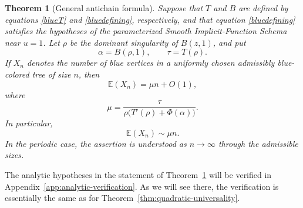 \documentclass[10pt,a4paper]{amsart}
\newtheorem{theorem}{Theorem}[section]
\theoremstyle{remark}
\begin{document}
\begin{theorem}[General antichain formula]\label{thm:bluegeneral}
Suppose that $T$ and $B$ are defined by equations \eqref{blueT} and
\eqref{bluedefining}, respectively, and that equation \eqref{bluedefining} satisfies the hypotheses
of the parameterized Smooth Implicit-Function Schema near $u=1$.  Let $\rho$
be the dominant singularity of $B(z,1)$, and put
\[
\alpha=B(\rho,1),\qquad \tau=T(\rho).
\]
If $X_n$ denotes the number of blue vertices in a uniformly chosen
admissibly blue-colored tree of size $n$, then
\[
\mathbb E(X_n)=\mu n+O(1),
\]
where
\begin{equation}\label{blueconstant}
{
\mu=
\frac{\tau}
{\rho\bigl(T'(\rho)+\Phi(\alpha)\bigr)}.
}
\end{equation}
In particular,
\[
\mathbb E(X_n)\sim \mu n.
\]
In the periodic case, the assertion is understood as $n\to\infty$ through
the admissible sizes.
\end{theorem}

The analytic hypotheses in the statement of Theorem~\ref{thm:bluegeneral}
will be verified in Appendix~\ref{app:analytic-verification}.  As we will
see there, the verification is essentially the same as for
Theorem~\ref{thm:quadratic-universality}.
\end{document}
